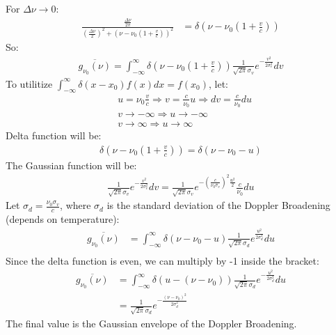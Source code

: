 \documentclass[11pt]{article}
\begin{document}
For $\Delta \nu \rightarrow 0$:
\begin{align*}
    \frac{\frac{\Delta \nu}{2 \pi}}{(\frac{\Delta \nu}{2})^2 + (\nu - \nu_0(1 + \frac{v}{c}))^2}
    &= \delta \left( \nu - \nu_0 \left(1 + \frac{v}{c} \right) \right)
\end{align*}
So:
\begin{align*}
    \overline{g_{\nu_0}(\nu)} = \int_{-\infty}^{\infty} \delta \left( \nu - \nu_0 \left(1 + \frac{v}{c} \right) \right) \frac{1}{\sqrt{2 \pi} \sigma_v} e^{-\frac{v^2}{2 \sigma_v^2}} dv
\end{align*}
To utilitize $\int_{-\infty}^{\infty} \delta(x-x_0) f(x) dx = f(x_0)$, let:
\begin{align*}
    &u = \nu_0 \frac{v}{c} \Rightarrow v = \frac{c}{\nu_0} u \Rightarrow dv = \frac{c}{\nu_0} du \\
    &v \rightarrow -\infty \Rightarrow u \rightarrow -\infty \\
    &v \rightarrow \infty \Rightarrow u \rightarrow \infty
\end{align*}
Delta function will be:
\begin{align*}
    \delta \left( \nu - \nu_0 \left(1 + \frac{v}{c} \right) \right) = \delta (\nu - \nu_0 - u)
\end{align*}
The Gaussian function will be:
\begin{align*}
    \frac{1}{\sqrt{2 \pi} \sigma_v} e^{-\frac{v^2}{2 \sigma_v^2}} dv = \frac{1}{\sqrt{2 \pi} \sigma_v} e^{-\left( \frac{c}{\nu_0 \sigma_v} \right)^2 \frac{u^2}{2}} \frac{c}{\nu_0} du
\end{align*}
Let $\sigma_d = \frac{\nu_0 \sigma_v}{c}$, where $\sigma_d$ is the standard deviation of the Doppler Broadening (depends on temperature):
\begin{align*}
    \overline{g_{\nu_0}(\nu)} &= \int_{-\infty}^{\infty} \delta (\nu - \nu_0 - u) \frac{1}{\sqrt{2 \pi} \sigma_d} e^{\frac{u^2}{2 \sigma_d^2}} du \\
\end{align*}
Since the delta function is even, we can multiply by -1 inside the bracket:
\begin{align*}
    \overline{g_{\nu_0}(\nu)} &= \int_{-\infty}^{\infty} \delta (u - (\nu - \nu_0)) \frac{1}{\sqrt{2 \pi} \sigma_d} e^{-\frac{u^2}{2 \sigma_d ^2}} du \\
    &= \frac{1}{\sqrt{2 \pi} \sigma_d} e^{-\frac{(\nu - \nu_0)^2}{2 \sigma_d^2}}
\end{align*}
The final value is the Gaussian envelope of the Doppler Broadening.
\end{document}
